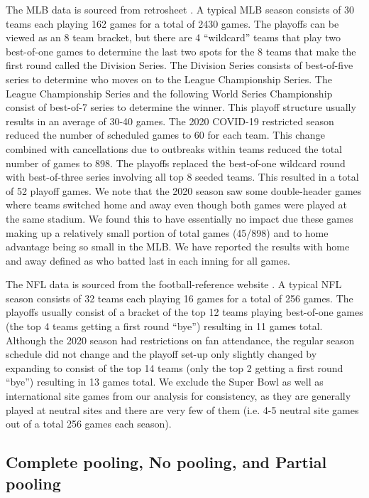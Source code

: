 The MLB data is sourced from retrosheet \cite{RS2020}. A typical MLB season consists of 30 teams each playing 162 games for a total of 2430 games. The playoffs can be viewed as an 8 team bracket, but there are 4 ``wildcard'' teams that play two best-of-one games to determine the last two spots for the 8 teams that make the first round called the Division Series. The Division Series consists of best-of-five series to determine who moves on to the League Championship Series. The League Championship Series and the following World Series Championship consist of best-of-7 series to determine the winner. This playoff structure usually results in an average of 30-40 games. The 2020 COVID-19 restricted season reduced the number of scheduled games to 60 for each team. This change combined with cancellations due to outbreaks within teams reduced the total number of games to 898. The playoffs replaced the best-of-one wildcard round with best-of-three series involving all top 8 seeded teams. This resulted in a total of 52 playoff games. We note that the 2020 season saw some double-header games where teams switched home and away even though both games were played at the same stadium. We found this to have essentially no impact due these games making up a relatively small portion of total games (45/898) and to home advantage being so small in the MLB. We have reported the results with home and away defined as who batted last in each inning for all games.

The NFL data is sourced from the football-reference website \cite{FR2020}. A typical NFL season consists of 32 teams each playing 16 games for a total of 256 games. The playoffs usually consist of a bracket of the top 12 teams playing best-of-one games (the top 4 teams getting a first round ``bye'') resulting in 11 games total. Although the 2020 season had restrictions on fan attendance, the regular season schedule did not change and the playoff set-up only slightly changed by expanding to consist of the top 14 teams (only the top 2 getting a first round ``bye'') resulting in 13 games total. We exclude the Super Bowl as well as international site games from our analysis for consistency, as they are generally played at neutral sites and there are very few of them (i.e. 4-5 neutral site games out of a total 256 games each season).

\subsection{Complete pooling, No pooling, and Partial pooling} \label{experiment_1}

